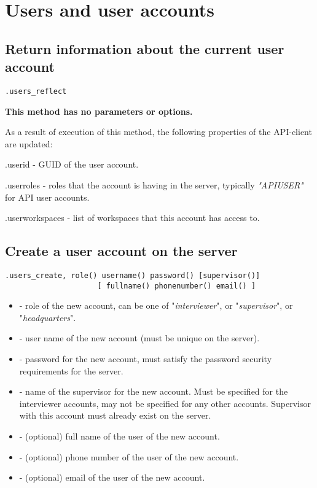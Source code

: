 \section{Users and user accounts}

\subsection{Return information about the current user account}
\begin{lstlisting}[style=CommandLineStyle]
.users_reflect
\end{lstlisting}

\textbf{This method has no parameters or options.}

\savedres

As a result of execution of this method, the following properties of the API-client are updated:

\begin{compactitem}
    \item .userid - GUID of the user account.
    \item .userroles - roles that the account is having in the server, typically \textit{"APIUSER"} for API user accounts.
    \item .userworkspaces - list of workspaces that this account has access to.
\end{compactitem}


\subsection{Create a user account on the server}
\begin{lstlisting}[style=CommandLineStyle]
.users_create, role() username() password() [supervisor()]
                     [ fullname() phonenumber() email() ]
\end{lstlisting}

\optsheader
\begin{itemize}
      \item {} - role of the new account, can be one of "\textit{interviewer}", or "\textit{supervisor}", or "\textit{headquarters}".
      \item {} - user name of the new account (must be unique on the server).
      \item {} - password for the new account, must satisfy the password security requirements for the server.
      \item {} - name of the supervisor for the new account. Must be specified for the interviewer accounts, may not be specified for any other accounts. Supervisor with this account must already exist on the server.
     \item {} - (optional) full name of the user of the new account.
     \item {} - (optional) phone number of the user of the new account.
     \item {} - (optional) email of the user of the new account.
\end{itemize}

